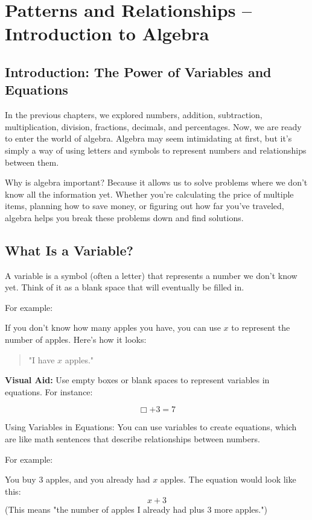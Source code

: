 \chapter{Patterns and Relationships – Introduction to Algebra}

\section{Introduction: The Power of Variables and Equations}
In the previous chapters, we explored numbers, addition, subtraction, multiplication, division, fractions, decimals, and percentages. Now, we are ready to enter the world of algebra. Algebra may seem intimidating at first, but it's simply a way of using letters and symbols to represent numbers and relationships between them.

Why is algebra important? Because it allows us to solve problems where we don't know all the information yet. Whether you're calculating the price of multiple items, planning how to save money, or figuring out how far you've traveled, algebra helps you break these problems down and find solutions.

\section{What Is a Variable?}
A variable is a symbol (often a letter) that represents a number we don’t know yet. Think of it as a blank space that will eventually be filled in.

For example:

If you don’t know how many apples you have, you can use $x$ to represent the number of apples. Here’s how it looks:

\begin{quote}
"I have $x$ apples."
\end{quote}

\textbf{Visual Aid:} Use empty boxes or blank spaces to represent variables in equations. For instance:

\[ \Box + 3 = 7 \]

Using Variables in Equations: You can use variables to create equations, which are like math sentences that describe relationships between numbers.

For example:

You buy 3 apples, and you already had $x$ apples. The equation would look like this:
\[ x + 3 \]
(This means "the number of apples I already had plus 3 more apples.")

